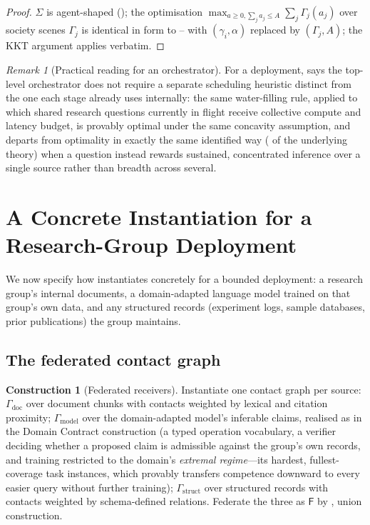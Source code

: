 \documentclass[11pt,twocolumn,a4paper]{article}
\theoremstyle{frathm}
\theoremstyle{definition}
\newtheorem{construction}[theorem]{Construction}
\theoremstyle{remark}
\newtheorem{remark}[theorem]{Remark}
\newcommand{\Gph}{\Gamma}
\newcommand{\Soc}{\Sigma}
\newcommand{\Fed}{\mathsf{F}}
\newcommand{\att}{\alpha}
\begin{document}
\begin{proof}
$\Soc$ is agent-shaped (); the optimisation
$\max_{a\ge0,\sum_j a_j\le A}\sum_j\Gamma_j(a_j)$ over society scenes
$\Gamma_j$ is identical in form to --
with $(\gamma_i,\att)$ replaced by $(\Gamma_j,A)$; the KKT argument
applies verbatim.
\end{proof}

\begin{remark}[Practical reading for an orchestrator]
\label{rem:orchestrator-reading}
For a deployment,  says the top-level orchestrator
does not require a separate scheduling heuristic distinct from the one
each stage already uses internally: the same water-filling rule, applied
to which shared research questions currently in flight receive collective
compute and latency budget, is provably optimal under the same concavity
assumption, and departs from optimality in exactly the same identified
way ( of the underlying theory) when a question
instead rewards sustained, concentrated inference over a single source
rather than breadth across several.
\end{remark}

\section{A Concrete Instantiation for a Research-Group Deployment}
\label{sec:deployment}

We now specify how  instantiates concretely for a
bounded deployment: a research group's internal documents, a
domain-adapted language model trained on that group's own data, and any
structured records (experiment logs, sample databases, prior
publications) the group maintains.

\subsection{The federated contact graph}

\begin{construction}[Federated receivers]
\label{con:federated}
Instantiate one contact graph per source: $\Gph_{\mathrm{doc}}$ over
document chunks with contacts weighted by lexical and citation proximity;
$\Gph_{\mathrm{model}}$ over the domain-adapted model's inferable claims,
realised as in the Domain Contract construction (a typed operation
vocabulary, a verifier deciding whether a proposed claim is admissible
against the group's own records, and training restricted to the domain's
\emph{extremal regime}---its hardest, fullest-coverage task instances,
which provably transfers competence downward to every easier query
without further training); $\Gph_{\mathrm{struct}}$ over structured
records with contacts weighted by schema-defined relations. Federate the
three as $\Fed$ by , union construction.
\end{construction}
\end{document}
